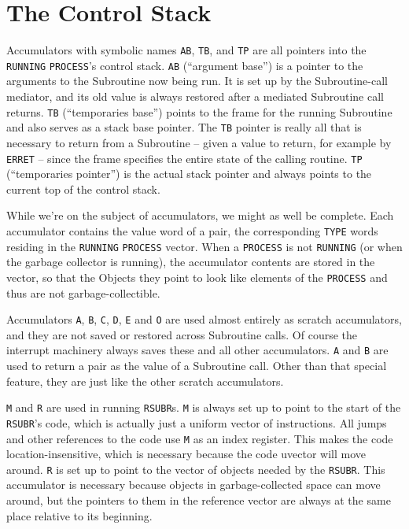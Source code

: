 \documentclass[a4paper]{scrbook}
\begin{document}
\section*{The Control Stack}
\label{the-control-stack}

Accumulators with symbolic names \texttt{AB}, \texttt{TB}, and \texttt{TP} are all pointers into the \texttt{RUNNING}
\texttt{PROCESS}'s control stack. \texttt{AB} (``argument base'') is a pointer to the arguments to the Subroutine now being
run. It is set up by the Subroutine-call mediator, and its old value is always restored after a mediated Subroutine call
returns. \texttt{TB} (``temporaries base'') points to the frame for the running Subroutine and also serves as a stack base
pointer. The \texttt{TB} pointer is really all that is necessary to return from a Subroutine -- given a value to return,
for example by \texttt{ERRET} -- since the frame specifies the entire state of the calling routine.
\texttt{TP} (``temporaries pointer'') is the actual stack pointer and always points to the current top of the control
stack.

While we're on the subject of accumulators, we might as well be complete. Each accumulator contains the value word of a
pair, the corresponding \texttt{TYPE} words residing in the \texttt{RUNNING} \texttt{PROCESS} vector. When a
\texttt{PROCESS} is not \texttt{RUNNING} (or when the garbage collector is running), the accumulator contents are stored in
the vector, so that the Objects they point to look like elements of the \texttt{PROCESS} and thus are not
garbage-collectible.

Accumulators \texttt{A}, \texttt{B}, \texttt{C}, \texttt{D}, \texttt{E} and \texttt{O} are used almost entirely as scratch
accumulators, and they are not saved or restored across Subroutine calls. Of course the interrupt machinery always saves
these and all other accumulators. \texttt{A} and \texttt{B} are used to return a pair as the value of a Subroutine call.
Other than that special feature, they are just like the other scratch accumulators.

\texttt{M} and \texttt{R} are used in running \texttt{RSUBR}s. \texttt{M} is always set up to point to the start of the
\texttt{RSUBR}'s code, which is actually just a uniform vector of instructions. All jumps and other references to the code
use \texttt{M} as an index register. This makes the code location-insensitive, which is necessary because the code uvector
will move around. \texttt{R} is set up to point to the vector of objects needed by the \texttt{RSUBR}. This accumulator is
necessary because objects in garbage-collected space can move around, but the pointers to them in the reference vector are
always at the same place relative to its beginning.
\end{document}
